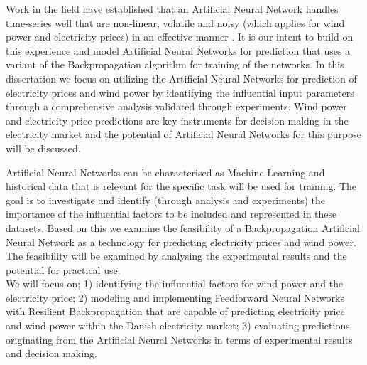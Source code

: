 Work in the field have established that an Artificial Neural Network handles time-series well that are non-linear, volatile and noisy (which applies for wind power and electricity prices) in an effective manner \cite{stockForecasting,pjmForecast,yamin2004adaptive,windForecastPortugal}. It is our intent to build on this experience and model Artificial Neural Networks for prediction that uses a variant of the Backpropagation algorithm for training of the networks. In this dissertation we focus on utilizing the Artificial Neural Networks for prediction of electricity prices and wind power by identifying the influential input parameters through a comprehensive analysis validated through experiments. Wind power and electricity price predictions are key instruments for decision making in the electricity market\cite{dayAheadImpactOfWindPowerForecasts,21} and the potential of Artificial Neural Networks for this purpose will be discussed.

Artificial Neural Networks can be characterised as Machine Learning\cite{18} and historical data that is relevant for the specific task will be used for training. The goal is to investigate and identify (through analysis and experiments) the importance of the influential factors to be included and represented in these datasets. Based on this we examine the feasibility of a Backpropagation Artificial Neural Network as a technology for predicting electricity prices and wind power. The feasibility will be examined by analysing the experimental results and the potential for practical use.
\\[0.5cm]
We will focus on; 1) identifying the influential factors for wind power and the electricity price; 2) modeling and implementing Feedforward Neural Networks with Resilient Backpropagation that are capable of predicting electricity price and wind power within the Danish electricity market; 3) evaluating predictions originating from the Artificial Neural Networks in terms of experimental results and decision making.